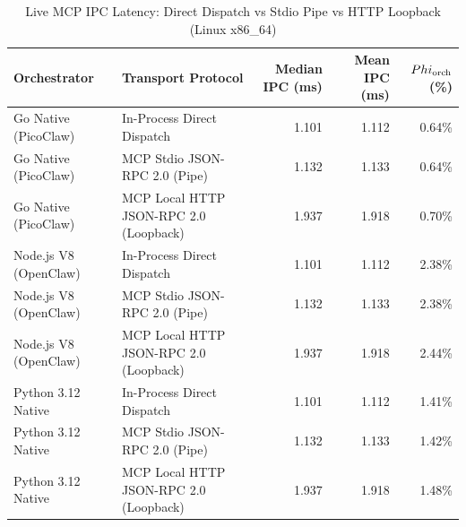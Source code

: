 \begin{table}[t]
\centering\small
\caption{Live MCP IPC Latency: Direct Dispatch vs Stdio Pipe vs HTTP Loopback (Linux x86_64)}
\label{tab:linux_mcp_transport}
\begin{tabular}{llrrr}
\toprule
Orchestrator & Transport Protocol & Median IPC (ms) & Mean IPC (ms) & $\\Phi_{\text{orch}}$ (\%) \\
\midrule
Go Native (PicoClaw) & In-Process Direct Dispatch & 1.101 & 1.112 & 0.64\% \\
Go Native (PicoClaw) & MCP Stdio JSON-RPC 2.0 (Pipe) & 1.132 & 1.133 & 0.64\% \\
Go Native (PicoClaw) & MCP Local HTTP JSON-RPC 2.0 (Loopback) & 1.937 & 1.918 & 0.70\% \\
Node.js V8 (OpenClaw) & In-Process Direct Dispatch & 1.101 & 1.112 & 2.38\% \\
Node.js V8 (OpenClaw) & MCP Stdio JSON-RPC 2.0 (Pipe) & 1.132 & 1.133 & 2.38\% \\
Node.js V8 (OpenClaw) & MCP Local HTTP JSON-RPC 2.0 (Loopback) & 1.937 & 1.918 & 2.44\% \\
Python 3.12 Native & In-Process Direct Dispatch & 1.101 & 1.112 & 1.41\% \\
Python 3.12 Native & MCP Stdio JSON-RPC 2.0 (Pipe) & 1.132 & 1.133 & 1.42\% \\
Python 3.12 Native & MCP Local HTTP JSON-RPC 2.0 (Loopback) & 1.937 & 1.918 & 1.48\% \\
\bottomrule
\end{tabular}
\end{table}

